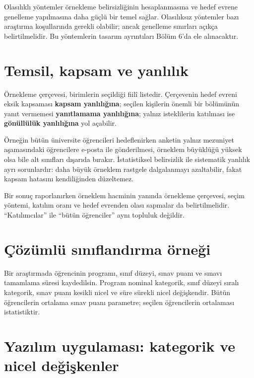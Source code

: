 Olasılıklı yöntemler örnekleme belirsizliğinin hesaplanmasına ve hedef evrene
genelleme yapılmasına daha güçlü bir temel sağlar. Olasılıksız yöntemler bazı
araştırma koşullarında gerekli olabilir; ancak genelleme sınırları açıkça
belirtilmelidir. Bu yöntemlerin tasarım ayrıntıları Bölüm 6'da ele alınacaktır.

\section{Temsil, kapsam ve yanlılık}
\label{sec:population-coverage}

Örnekleme çerçevesi, birimlerin seçildiği fiilî listedir. Çerçevenin hedef
evreni eksik kapsaması \textbf{kapsam yanlılığına}; seçilen kişilerin önemli
bir bölümünün yanıt vermemesi \textbf{yanıtlamama yanlılığına}; yalnız
isteklilerin katılması ise \textbf{gönüllülük yanlılığına} yol açabilir.

Örneğin bütün üniversite öğrencileri hedeflenirken anketin yalnız mezuniyet
aşamasındaki öğrencilere e-posta ile gönderilmesi, örneklem büyüklüğü yüksek
olsa bile alt sınıfları dışarıda bırakır. İstatistiksel belirsizlik ile
sistematik yanlılık ayrı sorunlardır: daha büyük örneklem rastgele
dalgalanmayı azaltabilir, fakat kapsam hatasını kendiliğinden düzeltemez.

\begin{researchbox}
Bir sonuç raporlanırken örneklem hacminin yanında örnekleme çerçevesi, seçim
yöntemi, katılım oranı ve hedef evrenden olası sapmalar da belirtilmelidir.
``Katılımcılar'' ile ``bütün öğrenciler'' aynı topluluk değildir.
\end{researchbox}

\section{Çözümlü sınıflandırma örneği}

Bir araştırmada öğrencinin programı, sınıf düzeyi, sınav puanı ve sınavı
tamamlama süresi kaydedilsin. Program nominal kategorik, sınıf düzeyi sıralı
kategorik, sınav puanı kesikli nicel ve süre sürekli nicel değişkendir. Bütün
öğrencilerin ortalama sınav puanı parametre; seçilen öğrencilerin ortalaması
istatistiktir.

\section{Yazılım uygulaması: kategorik ve nicel değişkenler}

